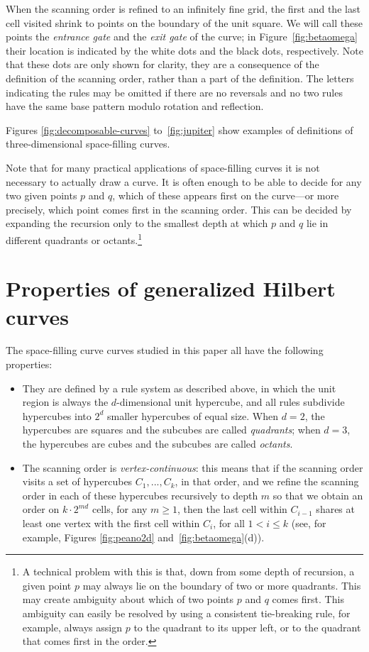 \documentclass[11pt,a4paper]{article}
\begin{document}
When the scanning order is refined to an infinitely fine grid, the first and the last cell visited shrink to points on the boundary of the unit square. We will call these points the \emph{entrance gate} and the \emph{exit gate} of the curve; in Figure~\ref{fig:betaomega} their location is indicated by the white dots and the black dots, respectively. Note that these dots are only shown for clarity, they are a consequence of the definition of the scanning order, rather than a part of the definition.
The letters indicating the rules may be omitted if there are no reversals and no two rules have the same base pattern modulo rotation and reflection.

Figures \ref{fig:decomposable-curves} to~\ref{fig:jupiter} show examples of definitions of three-dimensional space-filling curves.

Note that for many practical applications of space-filling curves it is not necessary to actually draw a curve. It is often enough to be able to decide for any two given points $p$ and $q$, which of these appears first on the curve---or more precisely, which point comes first in the scanning order. This can be decided by expanding the recursion only to the smallest depth at which $p$ and $q$ lie in different quadrants or octants.\footnote{A technical problem with this is that, down from some depth of recursion, a given point $p$ may always lie on the boundary of two or more quadrants. This may create ambiguity about which of two points $p$ and $q$ comes first. This ambiguity can easily be resolved by using a consistent tie-breaking rule, for example, always assign $p$ to the quadrant to its upper left, or to the quadrant that comes first in the order.}

\section{Properties of generalized Hilbert curves}
\label{sec:properties}

The space-filling curve curves studied in this paper all have the following properties:\begin{itemize}
\item They are defined by a rule system as described above, in which the unit region is always the $d$-dimensional unit hypercube, and all rules subdivide hypercubes into $2^d$ smaller hypercubes of equal size. When $d=2$, the hypercubes are squares and the subcubes are called \emph{quadrants}; when $d=3$, the hypercubes are cubes and the subcubes are called \emph{octants}.
\item The scanning order is \emph{vertex-continuous}: this means that if the scanning order visits a set of hypercubes $C_1,...,C_k$, in that order, and we refine the scanning order in each of these hypercubes recursively to depth $m$ so that we obtain an order on $k \cdot 2^{md}$ cells, for any $m \geq 1$, then the last cell within $C_{i-1}$ shares at least one vertex with the first cell within $C_i$, for all $1 < i \leq k$ (see, for example,  Figures \ref{fig:peano2d} and~\ref{fig:betaomega}(d)).
\end{itemize}
\end{document}

